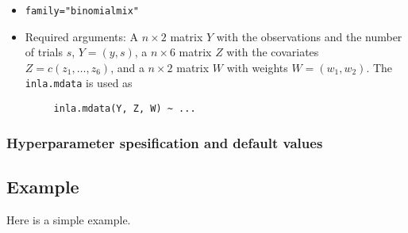 \documentclass[a4paper,11pt]{article}
\begin{document}
\begin{itemize}
\item \texttt{family="binomialmix"}
\item Required arguments: A $n\times 2$ matrix $Y$ with the
observations and the number of trials $s$,  $Y=(y, s)$,
    a $n\times 6$ matrix $Z$ with the covariates $Z=c(z_1, \ldots, z_6)$,
    and a $n\times 2$ matrix $W$ with weights $W=(w_1, w_2)$. The
    \texttt{inla.mdata} is used as
\begin{verbatim}
     inla.mdata(Y, Z, W) ~ ...
\end{verbatim}
\end{itemize}


\clearpage
\subsubsection*{Hyperparameter spesification and default values}
{\small }

\clearpage
\subsection*{Example}
Here is a simple example.

{\small }
\end{document}
